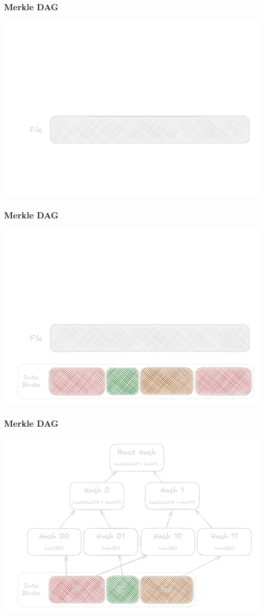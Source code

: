 \documentclass{../shipyard-slide}
\begin{document}
\begin{frame}
  \frametitle{Merkle DAG}
  \begin{center}
  \includegraphics[width=.7\linewidth]{resources/file.png}
  \end{center}
\end{frame}
\begin{frame}
  \frametitle{Merkle DAG}
  \begin{center}
  \includegraphics[width=.7\linewidth]{resources/chunks.png}
  \end{center}
\end{frame}
\begin{frame}
  \frametitle{Merkle DAG}
  \begin{center}
  \includegraphics[width=.7\linewidth]{resources/dag.png}
  \end{center}
\end{frame}
\end{document}
